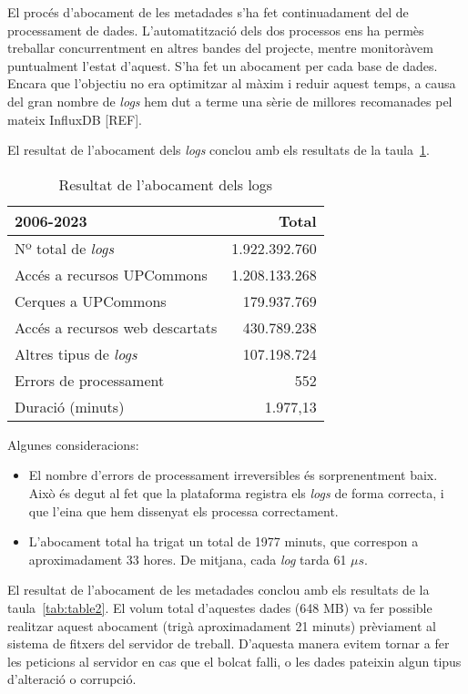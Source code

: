 \documentclass[lettersize,journal]{IEEEtran}
\begin{document}
El procés d'abocament de les metadades s'ha fet continuadament del de processament de dades.
L'automatització dels dos processos ens ha permès treballar concurrentment en altres bandes del projecte, mentre monitoràvem puntualment l'estat d'aquest.
S'ha fet un abocament per cada base de dades.
Encara que l'objectiu no era optimitzar al màxim i reduir aquest temps, a causa del gran nombre de \textit{logs} hem dut a terme una sèrie de millores recomanades pel mateix InfluxDB [REF].

El resultat de l'abocament dels \textit{logs} conclou amb els resultats de la taula~\ref{tab:table1}.

\begin{table}[!t]
    \caption{Resultat de l'abocament dels logs}\label{tab:table1}
    \centering
    \begin{tabular}{|l|r|}
        \hline
        \textbf{2006-2023} & Total\\
        \hline
        Nº total de \textit{logs}       & 1.922.392.760\\
        \hline
        Accés a recursos UPCommons      & 1.208.133.268\\
        \hline
        Cerques a UPCommons             & 179.937.769\\
        \hline
        Accés a recursos web descartats & 430.789.238\\
        \hline
        Altres tipus de \textit{logs}   & 107.198.724\\
        \hline
        Errors de processament          & 552\\
        \hline
        Duració (minuts)                & 1.977,13\\
        \hline
    \end{tabular}
\end{table}

Algunes consideracions:

\begin{itemize}
    \item El nombre d'errors de processament irreversibles és sorprenentment baix.
    Això és degut al fet que la plataforma registra els \textit{logs} de forma correcta, i que l'eina que hem dissenyat els processa correctament.
    \item L'abocament total ha trigat un total de 1977 minuts, que correspon a aproximadament 33 hores.
    De mitjana, cada \textit{log} tarda 61 \(\mu s\).
\end{itemize}

El resultat de l'abocament de les metadades conclou amb els resultats de la taula~\ref{tab:table2}.
El volum total d'aquestes dades (648 MB) va fer possible realitzar aquest abocament (trigà aproximadament 21 minuts) prèviament al sistema de fitxers del servidor de treball.
D’aquesta manera evitem tornar a fer les peticions al servidor en cas que el bolcat falli, o les dades pateixin algun tipus d’alteració o corrupció.
\end{document}
